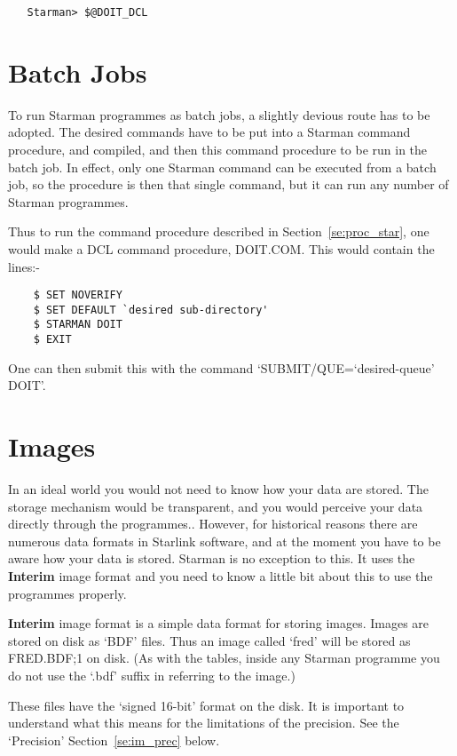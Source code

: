 \begin{verbatim}
   Starman> $@DOIT_DCL
\end{verbatim}

\section{Batch Jobs}

To run Starman programmes as batch jobs, a slightly devious route has to
be adopted. The desired commands have to be put into a Starman command
procedure, and compiled, and then this command procedure to be run in
the batch job. In effect, only one Starman command can be executed
from a batch job, so the procedure is then that single command, but it
can run any number of Starman programmes.

Thus to run the command procedure described in Section~\ref{se:proc_star},
one would make a {\small DCL} command procedure, DOIT.COM. This would
contain the lines:-

\begin{verbatim}
    $ SET NOVERIFY
    $ SET DEFAULT `desired sub-directory'
    $ STARMAN DOIT
    $ EXIT
\end{verbatim}

One can then submit this with the command `SUBMIT/QUE=`desired-queue' DOIT'.


\section{Images}

In an ideal world you would not need to know how your data are stored. The
storage mechanism would be transparent, and you would perceive your data
directly through the programmes..  However, for historical reasons there
are numerous data formats in Starlink software, and at the moment you have
to be aware how your data is stored. Starman is no exception to this.
It uses the {\bf Interim} image format and you need to know a
little bit about this to use the programmes properly. 

{\bf Interim} image format is a simple data format for storing images.
Images are stored on disk as `BDF' files. Thus an image called `fred' will
be stored as FRED.BDF;1 on disk. (As with the tables, inside any Starman
programme you do not use the `.bdf' suffix in referring to the image.) 

These files have the `signed 16-bit' format on the disk. It is 
important to understand what this means for the limitations of the 
precision. See the `Precision' Section~\ref{se:im_prec} below.

